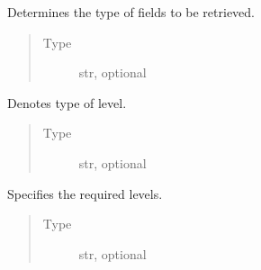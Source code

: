 \documentclass[letterpaper,10pt,english]{sphinxmanual}
\begin{document}
\begin{fulllineitems}
\begin{fulllineitems}
\end{fulllineitems}


\begin{fulllineitems}
\label{\detokenize{api:MarsRetrieval.MarsRetrieval.type}}
Determines the type of fields to be retrieved.
\begin{quote}\begin{description}
\item[{Type}] \leavevmode
str, optional

\end{description}\end{quote}

\end{fulllineitems}


\begin{fulllineitems}
\label{\detokenize{api:MarsRetrieval.MarsRetrieval.levtype}}
Denotes type of level.
\begin{quote}\begin{description}
\item[{Type}] \leavevmode
str, optional

\end{description}\end{quote}

\end{fulllineitems}


\begin{fulllineitems}
\label{\detokenize{api:MarsRetrieval.MarsRetrieval.levelist}}
Specifies the required levels.
\begin{quote}\begin{description}
\item[{Type}] \leavevmode
str, optional

\end{description}\end{quote}


\end{fulllineitems}
\end{fulllineitems}
\end{document}
